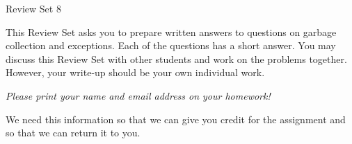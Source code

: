 \documentclass[12pt]{article} \usepackage{color} \usepackage{amsmath} \usepackage{amssymb}
\begin{document}
\begin{center}
{\large Review Set 8} 
\end{center}

This Review Set asks you to prepare written answers to questions on
garbage collection and exceptions. Each of the questions has
a short answer. You may discuss this Review Set with other students
and work on the problems together. However, your write-up should be
your own individual work.

\begin{center}
\emph{Please print your name and email address on your homework!}
\end{center}

\noindent We need this information so that we can give you credit for
the assignment and so that we can return it to you.
\end{document}
